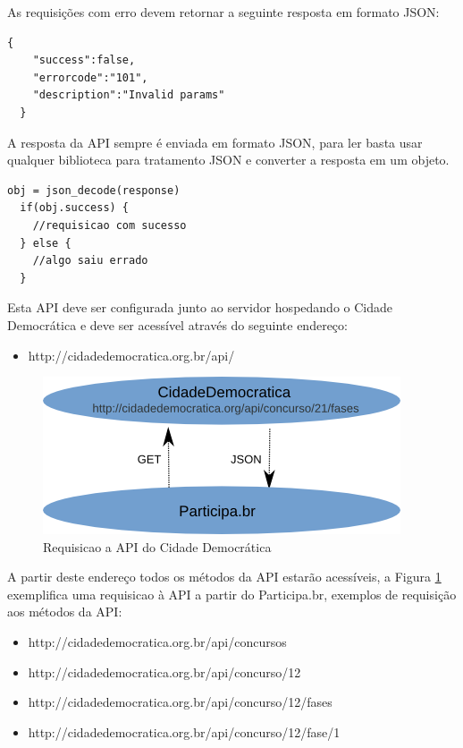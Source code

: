 \documentclass[12pt]{article}
\begin{document}
As requisições com erro devem retornar a seguinte resposta em formato JSON:

\begin{framed}
\begin{lstlisting}[caption=Exemplo de retorno JSON com erro]
  {
    "success":false,
    "errorcode":"101",
    "description":"Invalid params"
  }
\end{lstlisting}
\end{framed}


A resposta da API sempre é enviada em formato JSON, para ler basta usar
qualquer biblioteca para tratamento JSON e converter a resposta em um objeto.

\begin{framed}
\begin{lstlisting}[caption=Pseudo-código com exemplo de como tratar o retorno JSON]
  obj = json_decode(response)
  if(obj.success) {
    //requisicao com sucesso
  } else {
    //algo saiu errado
  }
\end{lstlisting}
\end{framed}

Esta API deve ser configurada junto ao servidor hospedando o Cidade
Democrática e deve ser acessível através do seguinte endereço:

\begin{itemize}
  \item http://cidadedemocratica.org.br/api/
\end{itemize}

\begin{figure}[h]
\center
\includegraphics[scale=0.5]{diagrama.png}
\caption{Requisicao a API do Cidade Democrática}
\label{diagrama}
\end{figure}

A partir deste endereço todos os métodos da API estarão acessíveis, a Figura
\ref{diagrama} exemplifica uma requisicao à API a partir do Participa.br,
exemplos de requisição aos métodos da API:

\begin{itemize}
  \item http://cidadedemocratica.org.br/api/concursos
  \item http://cidadedemocratica.org.br/api/concurso/12
  \item http://cidadedemocratica.org.br/api/concurso/12/fases
  \item http://cidadedemocratica.org.br/api/concurso/12/fase/1
\end{itemize}
\end{document}
